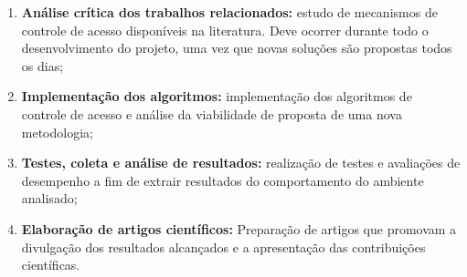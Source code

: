 \documentclass[a4paper]{article}
\begin{document}
\begin{enumerate}

	\item {\bf Análise crítica dos trabalhos relacionados:} estudo de mecanismos de controle de acesso disponíveis na literatura. Deve ocorrer durante todo o desenvolvimento do projeto, uma vez que novas soluções são propostas todos os dias;
	\item {\bf Implementação dos algoritmos:} implementação dos algoritmos de controle de acesso e análise da viabilidade de proposta de uma nova metodologia;
	\item {\bf Testes, coleta e análise de resultados:} realização de testes e avaliações de desempenho a fim de extrair resultados do comportamento do ambiente analisado;
	\item {\bf Elaboração de artigos científicos:} Preparação de artigos que promovam a divulgação dos resultados alcançados e a apresentação das contribuições científicas.

\end{enumerate}




\end{document}
